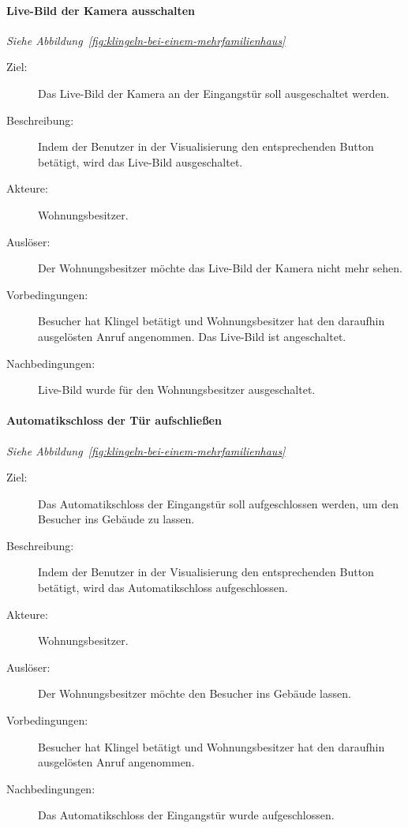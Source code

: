 \paragraph{\large{Live-Bild der Kamera ausschalten}}
\textit{Siehe Abbildung~\ref{fig:klingeln-bei-einem-mehrfamilienhaus}}
    \begin{description}
        \item[Ziel:] Das Live-Bild der Kamera an der Eingangstür soll ausgeschaltet werden.
        \item[Beschreibung:] Indem der Benutzer in der Visualisierung den entsprechenden Button betätigt, wird das Live-Bild ausgeschaltet.
        \item[Akteure:] Wohnungsbesitzer.
        \item[Auslöser:] Der Wohnungsbesitzer möchte das Live-Bild der Kamera nicht mehr sehen.
        \item[Vorbedingungen:] Besucher hat Klingel betätigt und Wohnungsbesitzer hat den daraufhin ausgelösten Anruf angenommen.
            Das Live-Bild ist angeschaltet.
        \item[Nachbedingungen:] Live-Bild wurde für den Wohnungsbesitzer ausgeschaltet.
    \end{description}

\paragraph{\large{Automatikschloss der Tür aufschließen}}
\textit{Siehe Abbildung~\ref{fig:klingeln-bei-einem-mehrfamilienhaus}}
    \begin{description}
        \item[Ziel:] Das Automatikschloss der Eingangstür soll aufgeschlossen werden, um den Besucher ins Gebäude zu lassen.
        \item[Beschreibung:] Indem der Benutzer in der Visualisierung den entsprechenden Button betätigt, wird das Automatikschloss aufgeschlossen.
        \item[Akteure:] Wohnungsbesitzer.
        \item[Auslöser:] Der Wohnungsbesitzer möchte den Besucher ins Gebäude lassen.
        \item[Vorbedingungen:] Besucher hat Klingel betätigt und Wohnungsbesitzer hat den daraufhin ausgelösten Anruf angenommen.
        \item[Nachbedingungen:] Das Automatikschloss der Eingangstür wurde aufgeschlossen.
    \end{description}

